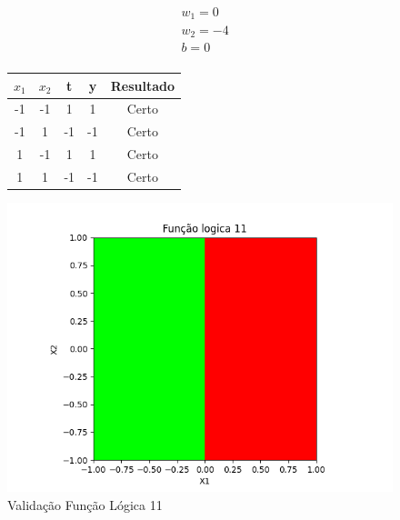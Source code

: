 \begin{figure}[h!]
\centering
\begin{minipage}[c]{0.49\linewidth}
\centering
\[
\begin{aligned}
&w_1 = 0\\
&w_2 = -4\\
&b = 0\\
\end{aligned}
\]
\begin{tabular}{|c|c|c|c|c|}\hline
$x_1$ & $x_2$ & t & y & Resultado\\ \hline
 -1 & -1 & 1 & 1 & Certo\\ \hline
 -1 & 1 & -1 & -1 & Certo\\ \hline
 1 & -1 & 1 & 1 & Certo\\ \hline
 1 & 1 & -1 & -1 & Certo\\ \hline
\end{tabular}
\end{minipage}
\hfill
\begin{minipage}[c]{0.5\linewidth}
\centering
\singlespacing
\includegraphics[width=1.2\textwidth]{im/im11}
\end{minipage}
\caption{Validação Função Lógica 11}
\label{vl11}
\end{figure}

